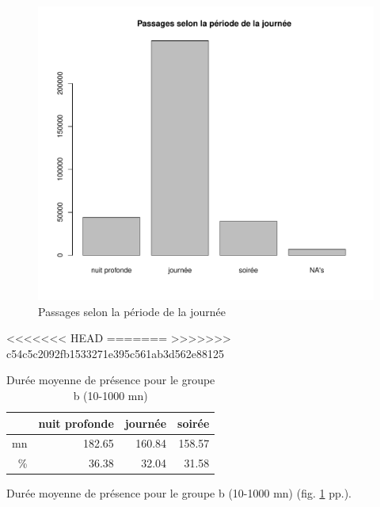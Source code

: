 \documentclass[12pt,english,french,twoside]{book}\usepackage[]{graphicx}\usepackage[]{color}
\makeatletter
\def\maxwidth{ %
  \ifdim\Gin@nat@width>\linewidth
    \linewidth
  \else
    \Gin@nat@width
  \fi
}
\newenvironment{knitrout}{}{} %
\makeatother
\begin{document}
\begin{figure}[ht!]
 \centering
\begin{knitrout}
\color{fgcolor}
\includegraphics[width=\maxwidth]{figure/periode_1} 

\end{knitrout}

 \caption{Passages selon la période de la journée}
 \label{fig:bp_periode1}
\end{figure}

<<<<<<< HEAD
=======
>>>>>>> c54c5c2092fb1533271e395c561ab3d562e88125
\begin{table}[ht]
\centering
\begin{tabular}{rrrr}
  \hline
 & nuit profonde & journée & soirée \\ 
  \hline
mn & 182.65 & 160.84 & 158.57 \\ 
  \% & 36.38 & 32.04 & 31.58 \\ 
   \hline
\end{tabular}
\caption{Durée moyenne de présence pour le groupe b (10-1000 mn)} 
\label{b_periode}
\end{table}



Durée moyenne de présence pour le groupe b (10-1000 mn) (fig. \ref{b_periode} pp.\pageref{b_periode}).
\end{document}
